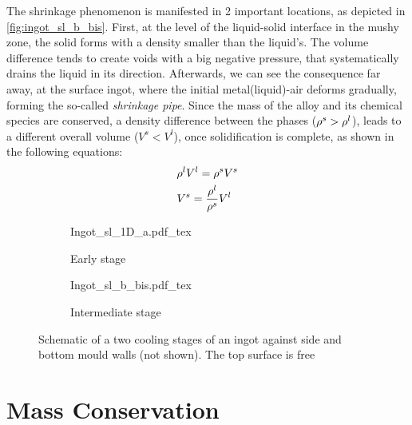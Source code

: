 The shrinkage phenomenon is manifested in 2 
important locations, as depicted in \autoref{fig:ingot_sl_b_bis}. First, at the level of the liquid-solid interface
in the mushy zone, the solid forms with a density smaller than the liquid's. The volume difference tends to create 
voids with a big negative pressure, that systematically drains the liquid in its direction. Afterwards, we can 
see the consequence far away, at the surface ingot, where the initial metal(liquid)-air deforms gradually, forming
the so-called \emph{shrinkage pipe}. Since the mass of the alloy and its chemical species are conserved, a density
difference between the phases ($\rho^s > \rho^l$), leads to a different overall volume ($V^s<V^l$), once solidification
is complete, as shown in the following equations:
\begin{subequations}
\begin{align}
& \rho^l V^l = \rho^s V^s  \\ 
& V^s = \frac{\rho^l}{\rho^s} V^l
\end{align}
\end{subequations}
\begin{figure}
\centering
\begin{subfigure}[h!]{0.3\textwidth}\centering %
	\def\svgwidth{100pt}
	{Ingot_sl_1D_a.pdf_tex}
	\caption{Early stage}
	\label{fig:ingot_1d_a}
\end{subfigure}
\begin{subfigure}[h!]{0.3\textwidth}\centering %
	\centering
	\def\svgwidth{100pt}
	{Ingot_sl_b_bis.pdf_tex}
	\caption{Intermediate stage}
	\label{fig:ingot_sl_b_bis}
\end{subfigure}
\caption{Schematic of a two cooling stages of an ingot against side and bottom mould walls (not shown). The top surface is free}
\end{figure}
\section{Mass Conservation}
